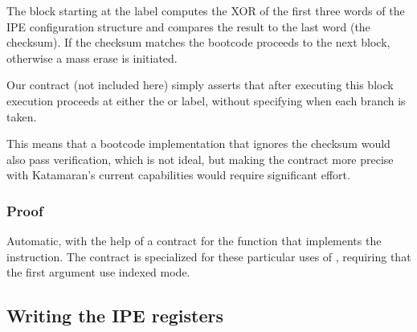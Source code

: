 The block starting at the  label computes the XOR of the first three words of the IPE configuration structure and compares the result to the last word (the checksum). If the checksum matches the bootcode proceeds to the next block, otherwise a mass erase is initiated.

Our contract (not included here) simply asserts that after executing this block execution proceeds at either the  or  label, without specifying when each branch is taken.

This means that a bootcode implementation that ignores the checksum would also pass verification, which is not ideal, but making the contract more precise with Katamaran's current capabilities would require significant effort.

\subsubsection{Proof}

Automatic, with the help of a contract for the  function that implements the  instruction.
The contract is specialized for these particular uses of , \eg requiring that the first argument use indexed mode.

\subsection{Writing the IPE registers}

